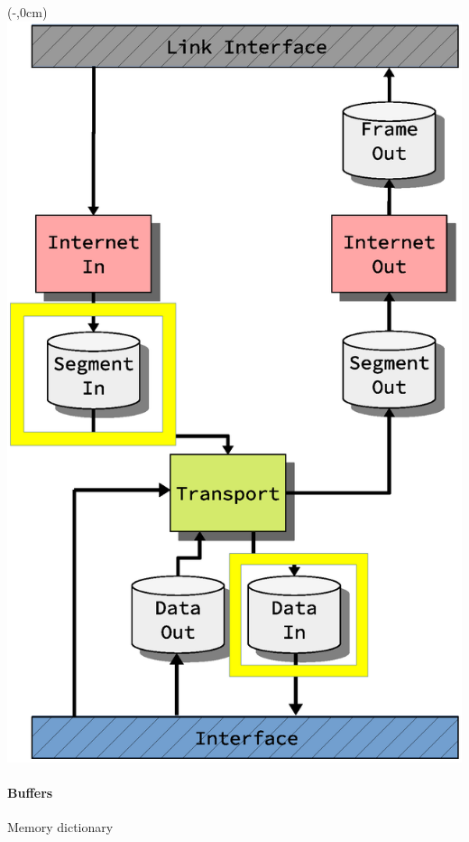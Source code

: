 \begin{frame}[t]
    \begin{textblock*}{\displayThumbnail}(\paperwidth-\displayThumbnail-0.2cm,0cm) %
        \colorbox{white}{\includegraphics[width=\textwidth]{implementation/design_2_memory_dictionary.eps}}
    \end{textblock*}
    \frametitle{\ImplementationTitle}
    \framesubtitle{Buffers}
    Memory dictionary
    \begin{columns}[t]
        \begin{column}{0.5\linewidth}
            \begin{figure}
                \centering

\end{figure}
\end{column}
\end{columns}
\end{frame}
